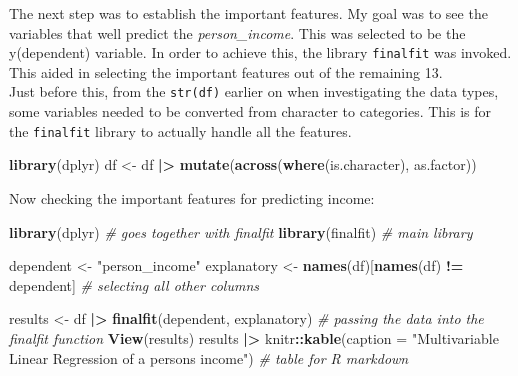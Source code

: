 \documentclass[
  10pt,
]{article}
\newenvironment{Shaded}{\begin{snugshade}}{\end{snugshade}}
\newcommand{\AttributeTok}[1]{\textcolor[rgb]{0.13,0.29,0.53}{#1}}
\newcommand{\CommentTok}[1]{\textcolor[rgb]{0.56,0.35,0.01}{\textit{#1}}}
\newcommand{\FunctionTok}[1]{\textcolor[rgb]{0.13,0.29,0.53}{\textbf{#1}}}
\newcommand{\NormalTok}[1]{#1}
\newcommand{\OtherTok}[1]{\textcolor[rgb]{0.56,0.35,0.01}{#1}}
\newcommand{\SpecialCharTok}[1]{\textcolor[rgb]{0.81,0.36,0.00}{\textbf{#1}}}
\newcommand{\StringTok}[1]{\textcolor[rgb]{0.31,0.60,0.02}{#1}}
\begin{document}
The next step was to establish the important features. My goal was to
see the variables that well predict the \emph{person\_income}. This was
selected to be the y(dependent) variable. In order to achieve this, the
library \texttt{finalfit} was invoked. This aided in selecting the
important features out of the remaining 13.\\

Just before this, from the \texttt{str(df)} earlier on when
investigating the data types, some variables needed to be converted from
character to categories. This is for the \texttt{finalfit} library to
actually handle all the features.\\

\begin{Shaded}
\begin{Highlighting}[]
\FunctionTok{library}\NormalTok{(dplyr)}
\NormalTok{df }\OtherTok{\textless{}{-}}\NormalTok{ df }\SpecialCharTok{|\textgreater{}}
    \FunctionTok{mutate}\NormalTok{(}\FunctionTok{across}\NormalTok{(}\FunctionTok{where}\NormalTok{(is.character), as.factor))}
\end{Highlighting}
\end{Shaded}

Now checking the important features for predicting income:\\

\begin{Shaded}
\begin{Highlighting}[]
\FunctionTok{library}\NormalTok{(dplyr)  }\CommentTok{\# goes together with finalfit}
\FunctionTok{library}\NormalTok{(finalfit)  }\CommentTok{\# main library}

\NormalTok{dependent }\OtherTok{\textless{}{-}} \StringTok{"person\_income"}
\NormalTok{explanatory }\OtherTok{\textless{}{-}} \FunctionTok{names}\NormalTok{(df)[}\FunctionTok{names}\NormalTok{(df) }\SpecialCharTok{!=}\NormalTok{ dependent]  }\CommentTok{\# selecting all other columns}

\NormalTok{results }\OtherTok{\textless{}{-}}\NormalTok{ df }\SpecialCharTok{|\textgreater{}}
    \FunctionTok{finalfit}\NormalTok{(dependent, explanatory)  }\CommentTok{\# passing the data into the finalfit function}
\FunctionTok{View}\NormalTok{(results)}
\NormalTok{results }\SpecialCharTok{|\textgreater{}}
\NormalTok{    knitr}\SpecialCharTok{::}\FunctionTok{kable}\NormalTok{(}\AttributeTok{caption =} \StringTok{"Multivariable Linear Regression of a person\textquotesingle{}s income"}\NormalTok{)  }\CommentTok{\# table for R markdown}
\end{Highlighting}
\end{Shaded}
\end{document}

